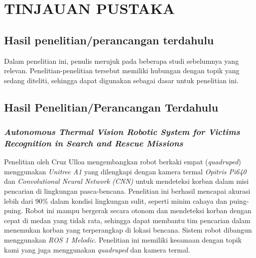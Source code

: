 \chapter{TINJAUAN PUSTAKA}
\label{chap:tinjauanpustaka}

\section{Hasil penelitian/perancangan terdahulu}
Dalam penelitian ini, penulis merujuk pada beberapa studi sebelumnya yang relevan. Penelitian-penelitian tersebut memiliki hubungan dengan topik yang sedang diteliti, sehingga dapat digunakan sebagai dasar untuk penelitian ini.

\section{Hasil Penelitian/Perancangan Terdahulu}



\subsection{\emph{Autonomous Thermal Vision Robotic System for Victims Recognition in Search and Rescue Missions}}

Penelitian oleh Cruz Ulloa mengembangkan robot berkaki empat (\emph{quadruped}) menggunakan \emph{Unitree A1} yang dilengkapi dengan kamera termal \emph{Opitris Pi640} dan \emph{Convolutional Neural Network (CNN)} untuk mendeteksi korban dalam misi pencarian di lingkungan pasca-bencana. Penelitian ini berhasil mencapai akurasi lebih dari 90\% dalam kondisi lingkungan sulit, seperti minim cahaya dan puing-puing. Robot ini mampu bergerak secara otonom dan mendeteksi korban dengan cepat di medan yang tidak rata, sehingga dapat membantu tim pencarian dalam menemukan korban yang terperangkap di lokasi bencana\cite{Cruz2021}. Sistem robot dibangun menggunakan \emph{ROS 1 Melodic}. Penelitian ini memiliki kesamaan dengan topik kami yang juga menggunakan \emph{quadruped} dan kamera termal.

